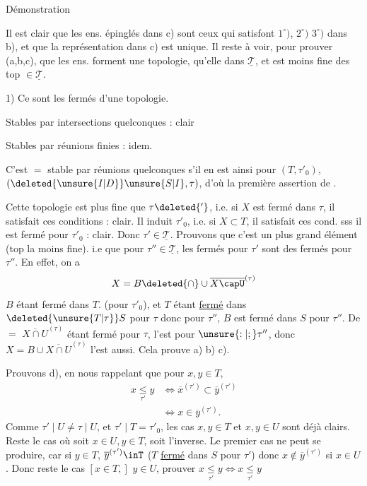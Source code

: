 Démonstration

  Il est clair que les ens. épinglés dans c) sont ceux qui satisfont $1^\circ)$, $2^\circ)$ $3^\circ)$ dans b), et que la représentation dans c) est unique. Il reste à voir, pour prouver (a,b,c), que les ens. forment une topologie,  qu'elle   dans $\underline{\mathscr{T}}$, et est moins fine des top $\in\underline{\mathscr{T}}$.

1) Ce sont les fermés d'une topologie.

Stables par intersections quelconques : clair

Stables par réunions finies : idem.

C'est $=$ stable par réunions quelconques s'il en est ainsi pour $(T,\tau'_0)$, $(\deleted{\unsure{I|D}}\unsure{S|I},\tau)$, d'où la première assertion de .

Cette topologie est plus fine que $\tau\deleted{'}$, i.e. si $X$ est fermé dans $\tau$, il satisfait ces conditions : clair. Il induit $\tau'_0$, i.e. si $X\subset T$, il satisfait ces cond. sss il est fermé pour $\tau'_0$ : clair. Donc $\tau'\in\underline{\mathscr{T}}$. Prouvons que c'est un plus grand élément (top la moins fine). i.e que pour  $\tau''\in\underline{\mathscr{T}}$, les fermés pour $\tau'$ sont des fermés pour $\tau''$. En effet, on a
\[
X=B\deleted{\cap}\cup\overline{X\capU}^{(\tau)}
\]
$B$ étant fermé dans $T$. (pour $\tau'_0$), et $T$ étant \uline{fermé} dans $\deleted{\unsure{T|\tau}}S$ pour $\tau$ donc  pour $\tau''$, $B$ est fermé dans $S$ pour $\tau''$.
De $=$ $\overline{X\cap U}^{(\tau)}$ étant fermé pour $\tau$, l'est pour $\unsure{:|;}\tau''$, donc $X=B\cup\overline{X\cap U}^{(\tau)}$ l'est aussi. Cela prouve a) b) c).

Prouvons d), en nous rappelant que pour $x,y\in T$,
\[
\begin{aligned}
x\underset{\tau'}{\leq}y&\Longleftrightarrow\overline{x}^{(\tau')}\subset\overline{y}^{(\tau')}\\
&\Longleftrightarrow x\in\overline{y}^{(\tau')}.
\end{aligned}
\]
Comme $\tau'\mid U\ne\tau\mid U$, et $\tau'\mid T=\tau'_0$, les cas $x,y\in T$ et $x,y\in U$ sont déjà clairs. Reste le cas où soit $x\in U,y\in T$, soit l'inverse. Le premier cas ne peut se produire, car si $y\in T$, $\overline{y}^{(\tau')}\inT$ ($T$ \uline{fermé} dans $S$ pour $\tau'$) donc $x\notin\overline{y}^{(\tau')}$  si $x\in U$. Donc reste le cas $[x\in T,]$ $y\in U$, prouver $x\underset{\tau'}{\leq}y\Longleftrightarrow x\underset{\tau'}{\leq}y$

